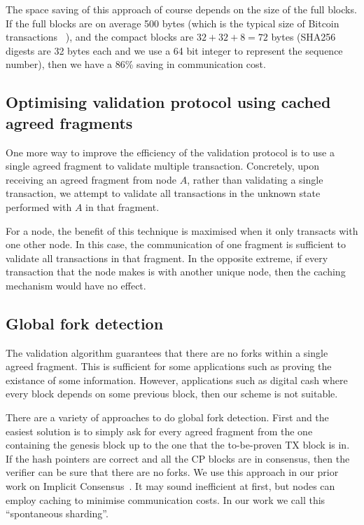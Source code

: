 The space saving of this approach of course depends on the size of the full blocks.
If the full blocks are on average 500 bytes
(which is the typical size of Bitcoin transactions ~\cite{txsize}),
and the compact blocks are $32 + 32 + 8 = 72$ bytes
(SHA256 digests are 32 bytes each and we use a 64 bit integer to represent the sequence number),
then we have a 86\% saving in communication cost.


\subsection{Optimising validation protocol using cached agreed fragments}
\label{sec:caching}
One more way to improve the efficiency of the validation protocol is to use a single agreed fragment to validate multiple transaction.
Concretely, upon receiving an agreed fragment from node $A$,
rather than validating a single transaction,
we attempt to validate all transactions in the unknown state performed with $A$ in that fragment.

For a node, the benefit of this technique is maximised when it only transacts with one other node.
In this case, the communication of one fragment is sufficient to validate all transactions in that fragment.
In the opposite extreme, if every transaction that the node makes is with another unique node,
then the caching mechanism would have no effect.

\subsection{Global fork detection}
The validation algorithm guarantees that there are no forks within a single agreed fragment.
This is sufficient for some applications such as proving the existance of some information.
However, applications such as digital cash where every block depends on some previous block,
then our scheme is not suitable.

There are a variety of approaches to do global fork detection.
First and the easiest solution is to simply ask for every agreed fragment from the one containing the genesis block up to the one that the to-be-proven TX block is in.
If the hash pointers are correct and all the CP blocks are in consensus, then the verifier can be sure that there are no forks.
We use this approach in our prior work on Implicit Consensus~\cite{implicitconsensus}.
It may sound inefficient at first, but nodes can employ caching to minimise communication costs.
In our work we call this ``spontaneous sharding''.

